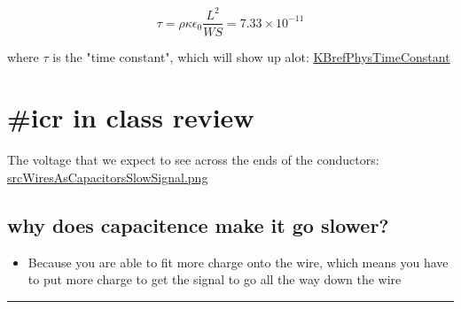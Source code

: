 \documentclass[letterpaper]{article}
\begin{document}
\[\tau
= \rho\kappa\epsilon_0\frac{L^2}{WS} = 7.33\times10^{-11}
\]

where \(\tau\) is the "time constant", which will show up alot:
\href{KBrefPhysTimeConstant.org}{KBrefPhysTimeConstant}

\section{\#icr in class review}
\label{sec:org2a13b02}
The voltage that we expect to see across the ends of the conductors:
\href{srcWiresAsCapacitorsSlowSignal.png.org}{srcWiresAsCapacitorsSlowSignal.png}

\subsection{why does capacitence make it go slower?}
\label{sec:orge408bb5}
\begin{itemize}
\item Because you are able to fit more charge onto the wire, which means you
have to put more charge to get the signal to go all the way down the
wire
\end{itemize}

\noindent\rule{\textwidth}{0.5pt}
\end{document}
